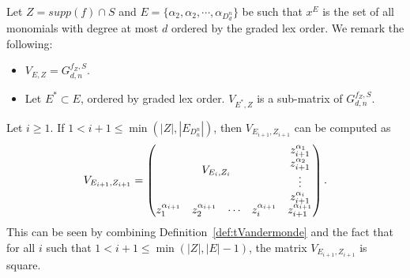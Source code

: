\documentclass[11pt]{llncs}
\begin{document}
\begin{remark}\label{rem:subsetOfReedMuller}
Let $Z = supp(f)\cap S$ and $E = \{\alpha_2, \alpha_2, \cdots, \alpha_{D_d^n}\}$ be such that $x^E$ is the set of all monomials with degree at most $d$ ordered by the graded lex order. 
    We remark the following:
    \begin{itemize}
        \item $V_{E,Z} = G_{d,n}^{f_{Z},S}$.
        \item Let $E^{*}\subset E$, ordered by graded lex order. $V_{E^{*},Z}$ is a sub-matrix of $G_{d,n}^{f_Z, S}$.
    \end{itemize}
\end{remark}

\begin{remark}\label{rem:squareConstruction}
 Let $i\geq 1$. If $1< i+1 \leq \min{\left(|Z|, |E_{D_n^n}|\right)}$, then $V_{E_{i+1},Z_{i+1}}$ can be computed as
    \begin{align*}
        V_{E_{i+1}, Z_{i+1}} = 
        \begin{pmatrix}
        \multicolumn{4}{c}{\multirow{4}{*}{$V_{E_{i}, Z_{i}}$}} & z_{i+1}^{\alpha_{1}}\\
        & & & & z_{i+1}^{\alpha_{2}}\\
        & & & & \vdots\\
        & & & & z_{i+1}^{\alpha_{i}}\\
        z_1^{\alpha_{i+1}} & z_2^{\alpha_{i+1}}& \cdots & z_{i}^{\alpha_{i+1}} & z_{i+1}^{\alpha_{i+1}}
    \end{pmatrix}.
    \end{align*}
    This can be seen by combining Definition~\ref{def:tVandermonde} and the fact that for all $i$ such that $1< i+1 \leq \min{\left(|Z|, |E|-1\right)}$, the matrix $V_{E_{i+1}, Z_{i+1}}$ is square.
\end{remark}
\end{document}
